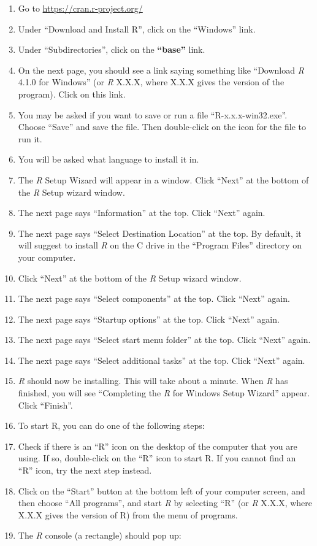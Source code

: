 \documentclass[
]{book}
\providecommand{\tightlist}{%
  \setlength{\itemsep}{0pt}\setlength{\parskip}{0pt}}
\begin{document}
\begin{enumerate}
\def\labelenumi{\arabic{enumi}.}
\tightlist
\item
  Go to \url{https://cran.r-project.org/}
\item
  Under ``Download and Install R'', click on the ``Windows'' link.
\item
  Under ``Subdirectories'', click on the \textbf{``base''} link.
\item
  On the next page, you should see a link saying something like ``Download \emph{R} 4.1.0 for Windows'' (or \emph{R} X.X.X, where X.X.X gives the version of the program). Click on this link.
\item
  You may be asked if you want to save or run a file ``R-x.x.x-win32.exe''. Choose ``Save'' and save the file. Then double-click on the icon for the file to run it.
\item
  You will be asked what language to install it in.
\item
  The \emph{R} Setup Wizard will appear in a window. Click ``Next'' at the bottom of the \emph{R} Setup wizard window.
\item
  The next page says ``Information'' at the top. Click ``Next'' again.
\item
  The next page says ``Select Destination Location'' at the top. By default, it will suggest to install \emph{R} on the C drive in the ``Program Files'' directory on your computer.
\item
  Click ``Next'' at the bottom of the \emph{R} Setup wizard window.
\item
  The next page says ``Select components'' at the top. Click ``Next'' again.
\item
  The next page says ``Startup options'' at the top. Click ``Next'' again.
\item
  The next page says ``Select start menu folder'' at the top. Click ``Next'' again.
\item
  The next page says ``Select additional tasks'' at the top. Click ``Next'' again.
\item
  \emph{R} should now be installing. This will take about a minute. When \emph{R} has finished, you will see ``Completing the \emph{R} for Windows Setup Wizard'' appear. Click ``Finish''.
\item
  To start R, you can do one of the following steps:
\item
  Check if there is an ``R'' icon on the desktop of the computer that you are using. If so, double-click on the ``R'' icon to start R. If you cannot find an ``R'' icon, try the next step instead.
\item
  Click on the ``Start'' button at the bottom left of your computer screen, and then choose ``All programs'', and start \emph{R} by selecting ``R'' (or \emph{R} X.X.X, where X.X.X gives the version of R) from the menu of programs.
\item
  The \emph{R} console (a rectangle) should pop up:
\end{enumerate}
\end{document}
